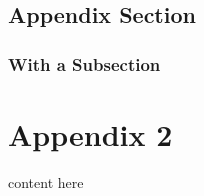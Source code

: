 \documentclass[hidelinks,11pt,a4paper,oneside,article]{memoir}
\begin{document}
\section{Appendix Section}


\subsection{With a Subsection}

\clearpage %



\chapter{Appendix 2}\label{appx:second}

content here 

\clearpage
{}
\end{document}
